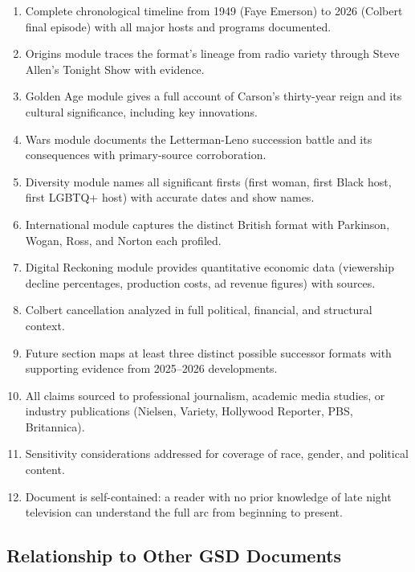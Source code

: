 \documentclass[11pt,letterpaper]{article}
\begin{document}
\begin{enumerate}[leftmargin=1.5em]
  \item Complete chronological timeline from 1949 (Faye Emerson) to 2026 (Colbert final episode) with all major hosts and programs documented.
  \item Origins module traces the format's lineage from radio variety through Steve Allen's Tonight Show with evidence.
  \item Golden Age module gives a full account of Carson's thirty-year reign and its cultural significance, including key innovations.
  \item Wars module documents the Letterman-Leno succession battle and its consequences with primary-source corroboration.
  \item Diversity module names all significant firsts (first woman, first Black host, first LGBTQ+ host) with accurate dates and show names.
  \item International module captures the distinct British format with Parkinson, Wogan, Ross, and Norton each profiled.
  \item Digital Reckoning module provides quantitative economic data (viewership decline percentages, production costs, ad revenue figures) with sources.
  \item Colbert cancellation analyzed in full political, financial, and structural context.
  \item Future section maps at least three distinct possible successor formats with supporting evidence from 2025--2026 developments.
  \item All claims sourced to professional journalism, academic media studies, or industry publications (Nielsen, Variety, Hollywood Reporter, PBS, Britannica).
  \item Sensitivity considerations addressed for coverage of race, gender, and political content.
  \item Document is self-contained: a reader with no prior knowledge of late night television can understand the full arc from beginning to present.
\end{enumerate}

\subsection{Relationship to Other GSD Documents}
\end{document}
